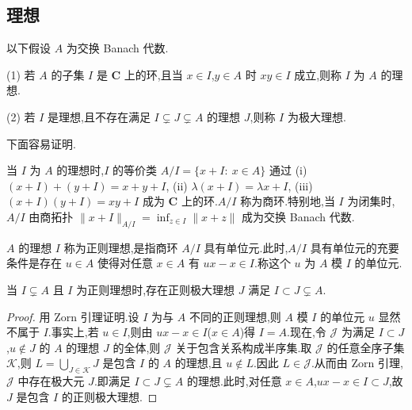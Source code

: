 \subsection{理想}\label{sec:3.1.3}

以下假设 $A$ 为交换 Banach 代数.

\begin{definition}\label{def:3.1.10}

(1) 若 $A$ 的子集 $I$ 是 $\mathbf{C}$ 上的环,且当 $x \in I$,$y \in A$ 时 $xy \in I$ 成立,则称 $I$ 为 $A$ 的理想.

(2) 若 $I$ 是理想,且不存在满足 $I \subsetneq J \subsetneq A$ 的理想 $J$,则称 $I$ 为极大理想.
\end{definition}

下面容易证明.

\begin{proposition}\label{prop:3.1.11}
当 $I$ 为 $A$ 的理想时,$I$ 的等价类 $A/I = \{x + I:\ x \in A\}$ 通过
(i) $(x + I) + (y + I) = x + y + I$,
(ii) $\lambda(x + I) = \lambda x + I$,
(iii) $(x + I)(y + I) = xy + I$
成为 $\mathbf{C}$ 上的环.$A/I$ 称为商环.特别地,当 $I$ 为闭集时,$A/I$ 由商拓扑 $\|x + I\|_{A/I} = \inf_{z \in I}\|x + z\|$ 成为交换 Banach 代数.
\end{proposition}

\begin{definition}\label{def:3.1.12}
$A$ 的理想 $I$ 称为正则理想,是指商环 $A/I$ 具有单位元.此时,$A/I$ 具有单位元的充要条件是存在 $u \in A$ 使得对任意 $x \in A$ 有 $ux - x \in I$.称这个 $u$ 为 $A$ 模 $I$ 的单位元.
\end{definition}

\begin{lemma}\label{lem:3.1.13}
当 $I \subsetneq A$ 且 $I$ 为正则理想时,存在正则极大理想 $J$ 满足 $I \subset J \subsetneq A$.
\end{lemma}

\begin{proof}
用 Zorn 引理证明.设 $I$ 为与 $A$ 不同的正则理想,则 $A$ 模 $I$ 的单位元 $u$ 显然不属于 $I$.事实上,若 $u \in I$,则由 $ux - x \in I$($x \in A$)得 $I = A$.现在,令 $\mathcal{J}$ 为满足 $I \subset J$,$u \notin J$ 的 $A$ 的理想 $J$ 的全体,则 $\mathcal{J}$ 关于包含关系构成半序集.取 $\mathcal{J}$ 的任意全序子集 $\mathcal{K}$,则 $L = \bigcup_{J \in \mathcal{K}} J$ 是包含 $I$ 的 $A$ 的理想,且 $u \notin L$.因此 $L \in \mathcal{J}$.从而由 Zorn 引理,$\mathcal{J}$ 中存在极大元 $J$.即满足 $I \subset J \subsetneq A$ 的理想.此时,对任意 $x \in A$,$ux - x \in I \subset J$,故 $J$ 是包含 $I$ 的正则极大理想.
\end{proof}

